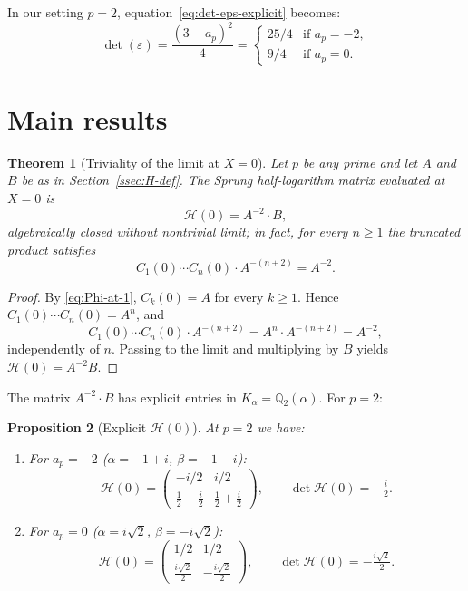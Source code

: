 \documentclass[11pt,a4paper]{amsart}
\newtheorem{theorem}{Theorem}[section]
\newtheorem{proposition}[theorem]{Proposition}
\theoremstyle{definition}
\newcommand{\Q}{\mathbb{Q}}
\newcommand{\eps}{\varepsilon}
\newcommand{\Hcal}{\mathcal{H}}
\begin{document}
In our setting $p = 2$, equation~\eqref{eq:det-eps-explicit} becomes:
\begin{equation}\label{eq:det-eps-explicit}
\det(\eps) = \frac{(3 - a_p)^2}{4} = \begin{cases} 25/4 & \text{if } a_p = -2, \\ 9/4 & \text{if } a_p = 0. \end{cases}
\end{equation}

\section{Main results}\label{sec:main}

\begin{theorem}[Triviality of the limit at $X = 0$]\label{thm:trivial-limit}
Let $p$ be any prime and let $A$ and $B$ be as in Section~\ref{ssec:H-def}. The Sprung half-logarithm matrix evaluated at $X = 0$ is
\begin{equation}\label{eq:H-zero}
\Hcal(0) = A^{-2} \cdot B,
\end{equation}
algebraically closed without nontrivial limit; in fact, for every $n \geq 1$ the truncated product satisfies
\begin{equation}\label{eq:Hn-zero}
C_1(0) \cdots C_n(0) \cdot A^{-(n+2)} = A^{-2}.
\end{equation}
\end{theorem}

\begin{proof}
By \eqref{eq:Phi-at-1}, $C_k(0) = A$ for every $k \geq 1$. Hence $C_1(0) \cdots C_n(0) = A^n$, and
\[
C_1(0) \cdots C_n(0) \cdot A^{-(n+2)} = A^n \cdot A^{-(n+2)} = A^{-2},
\]
independently of $n$. Passing to the limit and multiplying by $B$ yields $\Hcal(0) = A^{-2} B$.
\end{proof}

The matrix $A^{-2} \cdot B$ has explicit entries in $K_\alpha = \Q_2(\alpha)$. For $p = 2$:

\begin{proposition}[Explicit $\Hcal(0)$]\label{prop:H-explicit}
At $p = 2$ we have:
\begin{enumerate}
\item[(i)] For $a_p = -2$ ($\alpha = -1 + i$, $\beta = -1 - i$):
\begin{equation}
\Hcal(0) = \begin{pmatrix} -i/2 & i/2 \\ \tfrac{1}{2} - \tfrac{i}{2} & \tfrac{1}{2} + \tfrac{i}{2} \end{pmatrix}, \qquad \det \Hcal(0) = -\tfrac{i}{2}.
\end{equation}
\item[(ii)] For $a_p = 0$ ($\alpha = i\sqrt{2}$, $\beta = -i\sqrt{2}$):
\begin{equation}
\Hcal(0) = \begin{pmatrix} 1/2 & 1/2 \\ \tfrac{i\sqrt{2}}{2} & -\tfrac{i\sqrt{2}}{2} \end{pmatrix}, \qquad \det \Hcal(0) = -\tfrac{i\sqrt{2}}{2}.
\end{equation}
\end{enumerate}
\end{proposition}
\end{document}
